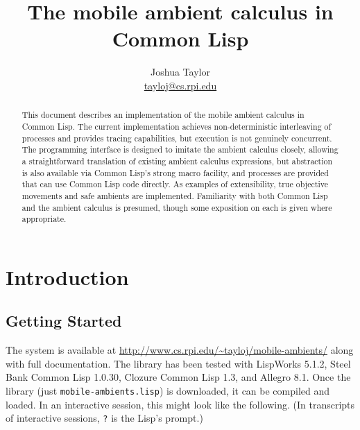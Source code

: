 \documentclass[12pt]{article}
\begin{document}
\title{The mobile ambient calculus in Common Lisp}
\author{Joshua Taylor\\\href{mailto:tayloj@cs.rpi.edu}{tayloj@cs.rpi.edu}}
\maketitle

\thispagestyle{empty}

\begin{abstract}
  This document describes an implementation of the mobile ambient calculus in Common Lisp.
The current implementation achieves non-deterministic interleaving of processes and provides tracing capabilities, but execution is not genuinely concurrent.
The programming interface is designed to imitate the ambient calculus closely, allowing a straightforward translation of existing ambient calculus expressions, but abstraction is also available via Common Lisp's strong macro facility, and processes are provided that can use Common Lisp code directly.
As examples of extensibility, true objective movements and safe ambients are implemented.
Familiarity with both Common Lisp and the ambient calculus is presumed, though some exposition on each is given where appropriate. 
\end{abstract}

\clearpage
{}
{\small\tableofcontents}

\clearpage
{}

\section{Introduction}
\label{introduction}

\subsection{Getting Started}
\label{sec:getting-started}

The system is available at \href{http://www.cs.rpi.edu/~tayloj/mobile-ambients/}{http://www.cs.rpi.edu/\textasciitilde{}tayloj/mobile-ambients/} along with full documentation.
The library has been tested with LispWorks 5.1.2, Steel Bank Common Lisp 1.0.30, Clozure Common Lisp 1.3, and Allegro 8.1.
Once the library (just \texttt{mobile-ambients.lisp}) is downloaded, it can be compiled and loaded.
In an interactive session, this might look like the following.
(In transcripts of interactive sessions, \texttt{?} is the Lisp's prompt.)
\end{document}
